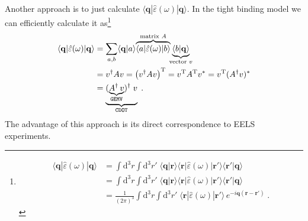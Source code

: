 \documentclass[a4paper,12pt]{article}
\begin{document}

    Another approach is to just calculate $\langle\mathbf{q} |\hat\varepsilon(\omega)| \mathbf{q}\rangle$. In the tight binding model we can efficiently calculate it as\footnote{ %
        \begin{equation*}
        \begin{aligned}
            \langle\mathbf{q} |\hat\varepsilon(\omega)| \mathbf{q}\rangle 
                &= \int\!\!\text{d}^3r \!\!\!\int\!\!\text{d}^3r'\; \langle\mathbf{q}|\mathbf{r}\rangle \langle\mathbf{r}|\hat\varepsilon(\omega)|\mathbf{r'}\rangle \langle\mathbf{r'}|\mathbf{q}\rangle \\
                &= \int\!\!\text{d}^3r \!\!\!\int\!\!\text{d}^3r'\; \langle\mathbf{q}|\mathbf{r}\rangle \langle\mathbf{r}|\hat\varepsilon(\omega)|\mathbf{r'}\rangle \langle\mathbf{r'}|\mathbf{q}\rangle \\
                &= \frac{1}{(2\pi)^3} \int\!\!\text{d}^3r \!\!\!\int\!\!\text{d}^3r'\; \langle\mathbf{r} |\hat\varepsilon(\omega)| \mathbf{r'}\rangle\, e^{-i\mathbf{q}(\mathbf{r} - \mathbf{r'})} \; .
        \end{aligned}
        \end{equation*}
    }
    \begin{equation*}
    \begin{aligned}
        \langle\mathbf{q} |\hat\varepsilon(\omega)| \mathbf{q}\rangle 
            &= \sum_{a,b} \langle\mathbf{q}|a\rangle \!\overbrace{\langle a|\hat\varepsilon(\omega)|b\rangle}^{\text{matrix } A} \!\!\underbrace{\langle b|\mathbf{q}\rangle}_{\text{vector } v} \\
            &= v^\dagger A v = \left( v^\dagger A v \right)^\text{T} = v^\text{T} A^\text{T} v^* 
             = v^\text{T} (A^\dagger v)^* \\
            &= \underbrace{(\underbrace{A^\dagger \, v}_{\text{\texttt{GEMV}}})^\dagger  \; v}_\text{\texttt{CDOT}}\;.
    \end{aligned}
    \end{equation*}
    The advantage of this approach is its direct correspondence to EELS experiments.  
    
\end{document}
